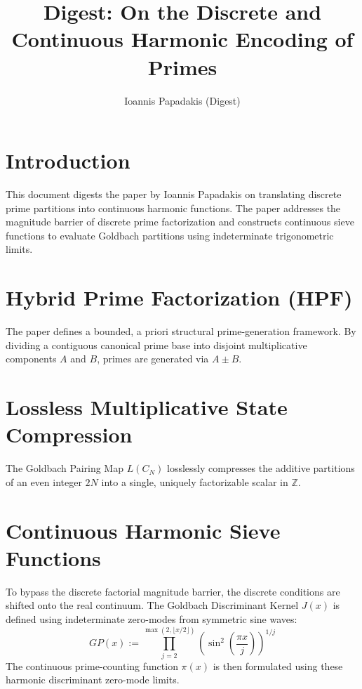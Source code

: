 \documentclass{article}
\begin{document}
\title{Digest: On the Discrete and Continuous Harmonic Encoding of Primes}
\author{Ioannis Papadakis (Digest)}
\maketitle

\section{Introduction}
This document digests the paper by Ioannis Papadakis on translating discrete prime partitions into continuous harmonic functions. The paper addresses the magnitude barrier of discrete prime factorization and constructs continuous sieve functions to evaluate Goldbach partitions using indeterminate trigonometric limits.

\section{Hybrid Prime Factorization (HPF)}
The paper defines a bounded, a priori structural prime-generation framework. By dividing a contiguous canonical prime base into disjoint multiplicative components $A$ and $B$, primes are generated via $A \pm B$.

\section{Lossless Multiplicative State Compression}
The Goldbach Pairing Map $L(C_N)$ losslessly compresses the additive partitions of an even integer $2N$ into a single, uniquely factorizable scalar in $\mathbb{Z}$.

\section{Continuous Harmonic Sieve Functions}
To bypass the discrete factorial magnitude barrier, the discrete conditions are shifted onto the real continuum. The Goldbach Discriminant Kernel $J(x)$ is defined using indeterminate zero-modes from symmetric sine waves:
\begin{equation}
GP(x) := \prod_{j=2}^{\max(2, \lfloor x/2 \rfloor)} \left(\sin^2\left(\frac{\pi x}{j}\right)\right)^{1/j}
\end{equation}
The continuous prime-counting function $\pi(x)$ is then formulated using these harmonic discriminant zero-mode limits.
\end{document}
